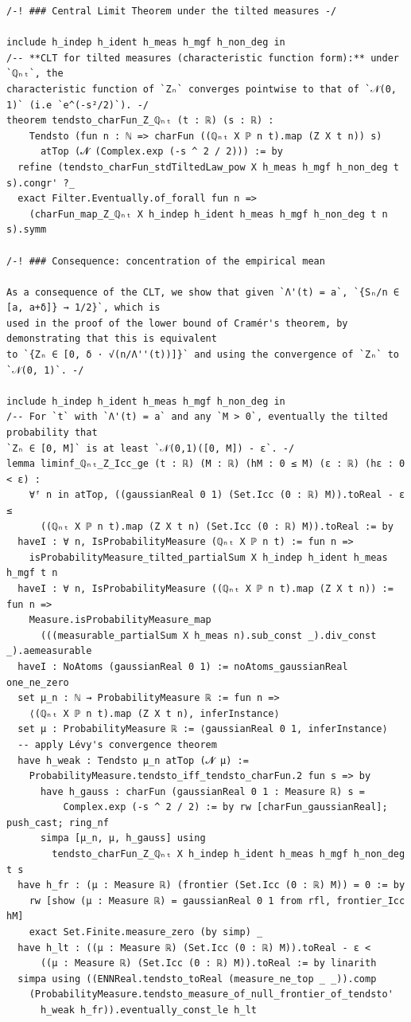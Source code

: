 \begin{lstlisting}
/-! ### Central Limit Theorem under the tilted measures -/

include h_indep h_ident h_meas h_mgf h_non_deg in
/-- **CLT for tilted measures (characteristic function form):** under `ℚₙₜ`, the
characteristic function of `Zₙ` converges pointwise to that of `𝒩(0, 1)` (i.e `e^(-s²/2)`). -/
theorem tendsto_charFun_Z_ℚₙₜ (t : ℝ) (s : ℝ) :
    Tendsto (fun n : ℕ => charFun ((ℚₙₜ X ℙ n t).map (Z X t n)) s)
      atTop (𝓝 (Complex.exp (-s ^ 2 / 2))) := by
  refine (tendsto_charFun_stdTiltedLaw_pow X h_meas h_mgf h_non_deg t s).congr' ?_
  exact Filter.Eventually.of_forall fun n =>
    (charFun_map_Z_ℚₙₜ X h_indep h_ident h_meas h_mgf h_non_deg t n s).symm

/-! ### Consequence: concentration of the empirical mean

As a consequence of the CLT, we show that given `Λ'(t) = a`, `{Sₙ/n ∈ [a, a+δ]} → 1/2}`, which is
used in the proof of the lower bound of Cramér's theorem, by demonstrating that this is equivalent
to `{Zₙ ∈ [0, δ · √(n/Λ''(t))]}` and using the convergence of `Zₙ` to `𝒩(0, 1)`. -/

include h_indep h_ident h_meas h_mgf h_non_deg in
/-- For `t` with `Λ'(t) = a` and any `M > 0`, eventually the tilted probability that
`Zₙ ∈ [0, M]` is at least `𝒩(0,1)([0, M]) - ε`. -/
lemma liminf_ℚₙₜ_Z_Icc_ge (t : ℝ) (M : ℝ) (hM : 0 ≤ M) (ε : ℝ) (hε : 0 < ε) :
    ∀ᶠ n in atTop, ((gaussianReal 0 1) (Set.Icc (0 : ℝ) M)).toReal - ε ≤
      ((ℚₙₜ X ℙ n t).map (Z X t n) (Set.Icc (0 : ℝ) M)).toReal := by
  haveI : ∀ n, IsProbabilityMeasure (ℚₙₜ X ℙ n t) := fun n =>
    isProbabilityMeasure_tilted_partialSum X h_indep h_ident h_meas h_mgf t n
  haveI : ∀ n, IsProbabilityMeasure ((ℚₙₜ X ℙ n t).map (Z X t n)) := fun n =>
    Measure.isProbabilityMeasure_map
      (((measurable_partialSum X h_meas n).sub_const _).div_const _).aemeasurable
  haveI : NoAtoms (gaussianReal 0 1) := noAtoms_gaussianReal one_ne_zero
  set μ_n : ℕ → ProbabilityMeasure ℝ := fun n =>
    ⟨(ℚₙₜ X ℙ n t).map (Z X t n), inferInstance⟩
  set μ : ProbabilityMeasure ℝ := ⟨gaussianReal 0 1, inferInstance⟩
  -- apply Lévy's convergence theorem
  have h_weak : Tendsto μ_n atTop (𝓝 μ) :=
    ProbabilityMeasure.tendsto_iff_tendsto_charFun.2 fun s => by
      have h_gauss : charFun (gaussianReal 0 1 : Measure ℝ) s =
          Complex.exp (-s ^ 2 / 2) := by rw [charFun_gaussianReal]; push_cast; ring_nf
      simpa [μ_n, μ, h_gauss] using
        tendsto_charFun_Z_ℚₙₜ X h_indep h_ident h_meas h_mgf h_non_deg t s
  have h_fr : (μ : Measure ℝ) (frontier (Set.Icc (0 : ℝ) M)) = 0 := by
    rw [show (μ : Measure ℝ) = gaussianReal 0 1 from rfl, frontier_Icc hM]
    exact Set.Finite.measure_zero (by simp) _
  have h_lt : ((μ : Measure ℝ) (Set.Icc (0 : ℝ) M)).toReal - ε <
      ((μ : Measure ℝ) (Set.Icc (0 : ℝ) M)).toReal := by linarith
  simpa using ((ENNReal.tendsto_toReal (measure_ne_top _ _)).comp
    (ProbabilityMeasure.tendsto_measure_of_null_frontier_of_tendsto'
      h_weak h_fr)).eventually_const_le h_lt

\end{lstlisting}
